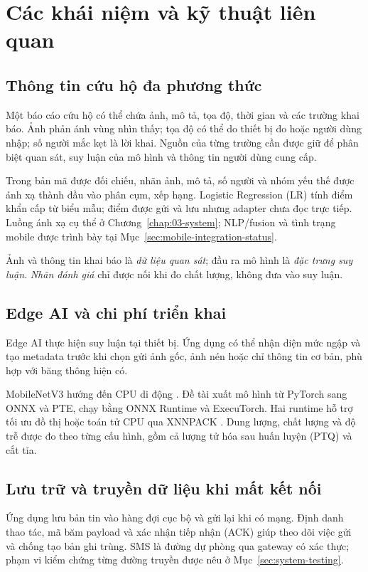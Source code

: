 \section{Các khái niệm và kỹ thuật liên quan}\label{sec:01-foundations-background}
\subsection{Thông tin cứu hộ đa phương thức}
Một báo cáo cứu hộ có thể chứa ảnh, mô tả, tọa độ, thời gian và các trường khai báo. Ảnh phản ánh vùng nhìn thấy; tọa độ có thể do thiết bị đo hoặc người dùng nhập; số người mắc kẹt là lời khai. Nguồn của từng trường cần được giữ để phân biệt quan sát, suy luận của mô hình và thông tin người dùng cung cấp.

Trong bản mã được đối chiếu, nhãn ảnh, mô tả, số người và nhóm yếu thế được ánh xạ thành đầu vào phân cụm, xếp hạng. Logistic Regression (LR) tính điểm khẩn cấp từ biểu mẫu; điểm được gửi và lưu nhưng adapter chưa đọc trực tiếp. Luồng ánh xạ cụ thể ở Chương~\ref{chap:03-system}; NLP/fusion và tình trạng mobile được trình bày tại Mục~\ref{sec:mobile-integration-status}.

Ảnh và thông tin khai báo là \emph{dữ liệu quan sát}; đầu ra mô hình là \emph{đặc trưng suy luận}. \emph{Nhãn đánh giá} chỉ được nối khi đo chất lượng, không đưa vào suy luận.

\subsection{Edge AI và chi phí triển khai}
Edge AI thực hiện suy luận tại thiết bị. Ứng dụng có thể nhận diện mức ngập và tạo metadata trước khi chọn gửi ảnh gốc, ảnh nén hoặc chỉ thông tin cơ bản, phù hợp với băng thông hiện có.

MobileNetV3 hướng đến CPU di động \citep{howard2019mobilenetv3}. Đề tài xuất mô hình từ PyTorch sang ONNX và PTE, chạy bằng ONNX Runtime và ExecuTorch. Hai runtime hỗ trợ tối ưu đồ thị hoặc toán tử CPU qua XNNPACK \citep{onnxGraphOptimizations,executorchXnnpack}. Dung lượng, chất lượng và độ trễ được đo theo từng cấu hình, gồm cả lượng tử hóa sau huấn luyện (PTQ) và cắt tỉa.

\subsection{Lưu trữ và truyền dữ liệu khi mất kết nối}
Ứng dụng lưu bản tin vào hàng đợi cục bộ và gửi lại khi có mạng. Định danh thao tác, mã băm payload và xác nhận tiếp nhận (ACK) giúp theo dõi việc gửi và chống tạo bản ghi trùng. SMS là đường dự phòng qua gateway có xác thực; phạm vi kiểm chứng từng đường truyền được nêu ở Mục~\ref{sec:system-testing}.

